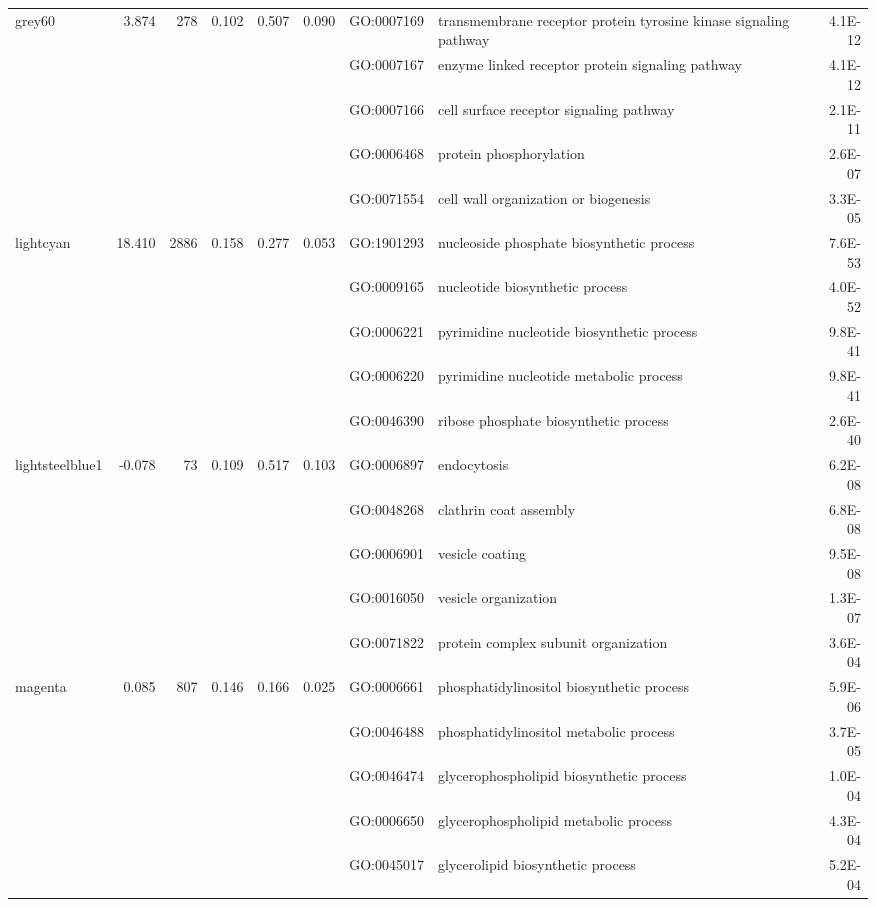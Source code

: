 \documentclass{ut-thesis}
\begin{document}
\begin{landscape}
\begin{table}[ht]
\begin{tabular}{|l|rrrrrlP{5cm}r|}
 grey60 & 3.874 & 278 & 0.102 & 0.507 & 0.090 & GO:0007169 & transmembrane receptor protein tyrosine kinase signaling pathway & 4.1E-12 \\ 
   &  &  &  &  &  & GO:0007167 & enzyme linked receptor protein signaling pathway & 4.1E-12 \\ 
   &  &  &  &  &  & GO:0007166 & cell surface receptor signaling pathway & 2.1E-11 \\ 
   &  &  &  &  &  & GO:0006468 & protein phosphorylation & 2.6E-07 \\ 
   &  &  &  &  &  & GO:0071554 & cell wall organization or biogenesis & 3.3E-05 \\ 
\hline 
 lightcyan & 18.410 & 2886 & 0.158 & 0.277 & 0.053 & GO:1901293 & nucleoside phosphate biosynthetic process & 7.6E-53 \\ 
   &  &  &  &  &  & GO:0009165 & nucleotide biosynthetic process & 4.0E-52 \\ 
   &  &  &  &  &  & GO:0006221 & pyrimidine nucleotide biosynthetic process & 9.8E-41 \\ 
   &  &  &  &  &  & GO:0006220 & pyrimidine nucleotide metabolic process & 9.8E-41 \\ 
   &  &  &  &  &  & GO:0046390 & ribose phosphate biosynthetic process & 2.6E-40 \\ 
\hline 
 lightsteelblue1 & -0.078 & 73 & 0.109 & 0.517 & 0.103 & GO:0006897 & endocytosis & 6.2E-08 \\ 
   &  &  &  &  &  & GO:0048268 & clathrin coat assembly & 6.8E-08 \\ 
   &  &  &  &  &  & GO:0006901 & vesicle coating & 9.5E-08 \\ 
   &  &  &  &  &  & GO:0016050 & vesicle organization & 1.3E-07 \\ 
   &  &  &  &  &  & GO:0071822 & protein complex subunit organization & 3.6E-04 \\ 
\hline 
 magenta & 0.085 & 807 & 0.146 & 0.166 & 0.025 & GO:0006661 & phosphatidylinositol biosynthetic process & 5.9E-06 \\ 
   &  &  &  &  &  & GO:0046488 & phosphatidylinositol metabolic process & 3.7E-05 \\ 
   &  &  &  &  &  & GO:0046474 & glycerophospholipid biosynthetic process & 1.0E-04 \\ 
   &  &  &  &  &  & GO:0006650 & glycerophospholipid metabolic process & 4.3E-04 \\ 
   &  &  &  &  &  & GO:0045017 & glycerolipid biosynthetic process & 5.2E-04 \\ 
\hline 
\end{tabular}
\end{table}



\end{landscape}
\end{document}
